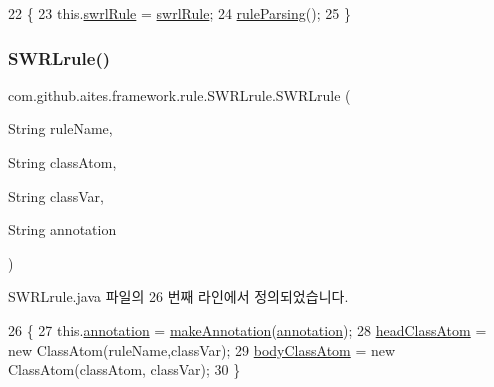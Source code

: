 \begin{DoxyCode}
22                                     \{
23         this.\mbox{\hyperlink{classcom_1_1github_1_1aites_1_1framework_1_1rule_1_1_s_w_r_lrule_adde1291a731073840a5ac9e535bf6f3f}{swrlRule}} = \mbox{\hyperlink{classcom_1_1github_1_1aites_1_1framework_1_1rule_1_1_s_w_r_lrule_adde1291a731073840a5ac9e535bf6f3f}{swrlRule}};
24         \mbox{\hyperlink{classcom_1_1github_1_1aites_1_1framework_1_1rule_1_1_s_w_r_lrule_a1521b7ed4a4dc7b19712c12501ffec0c}{ruleParsing}}();
25     \}
\end{DoxyCode}
\mbox{\label{classcom_1_1github_1_1aites_1_1framework_1_1rule_1_1_s_w_r_lrule_ae70ff52287865719636e6c63ece1fcd2}} 
\subsubsection{\texorpdfstring{S\+W\+R\+Lrule()}{SWRLrule()}\hspace{0.1cm}{\footnotesize\ttfamily [2/2]}}
{\footnotesize\ttfamily com.\+github.\+aites.\+framework.\+rule.\+S\+W\+R\+Lrule.\+S\+W\+R\+Lrule (\begin{DoxyParamCaption}\item[{String}]{rule\+Name,  }\item[{String}]{class\+Atom,  }\item[{String}]{class\+Var,  }\item[{String}]{annotation }\end{DoxyParamCaption})}



S\+W\+R\+Lrule.\+java 파일의 26 번째 라인에서 정의되었습니다.


\begin{DoxyCode}
26                                                                                           \{
27         this.\mbox{\hyperlink{classcom_1_1github_1_1aites_1_1framework_1_1rule_1_1_s_w_r_lrule_af98a0b14045d483b30ad511f0627fe3f}{annotation}} = \mbox{\hyperlink{classcom_1_1github_1_1aites_1_1framework_1_1rule_1_1_s_w_r_lrule_a504b81036fa3b32cede4a4a5a94929d6}{makeAnnotation}}(\mbox{\hyperlink{classcom_1_1github_1_1aites_1_1framework_1_1rule_1_1_s_w_r_lrule_af98a0b14045d483b30ad511f0627fe3f}{annotation}});
28         \mbox{\hyperlink{classcom_1_1github_1_1aites_1_1framework_1_1rule_1_1_s_w_r_lrule_a687c4ba8bc9724b6a06ab4bb9301ca86}{headClassAtom}} = \textcolor{keyword}{new} ClassAtom(ruleName,classVar);
29         \mbox{\hyperlink{classcom_1_1github_1_1aites_1_1framework_1_1rule_1_1_s_w_r_lrule_a3400b10f602a6a7d7abd42681d7af024}{bodyClassAtom}} = \textcolor{keyword}{new} ClassAtom(classAtom, classVar);
30     \}
\end{DoxyCode}


